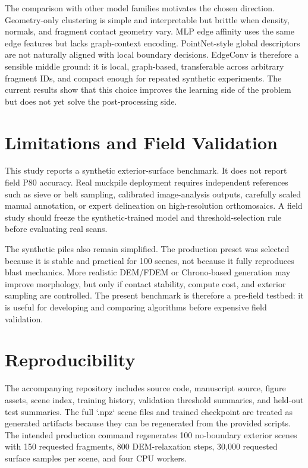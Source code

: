 \documentclass[11pt]{article}
\begin{document}
The comparison with other model families motivates the chosen direction. Geometry-only clustering is simple and interpretable but brittle when density, normals, and fragment contact geometry vary. MLP edge affinity uses the same edge features but lacks graph-context encoding. PointNet-style global descriptors are not naturally aligned with local boundary decisions. EdgeConv is therefore a sensible middle ground: it is local, graph-based, transferable across arbitrary fragment IDs, and compact enough for repeated synthetic experiments. The current results show that this choice improves the learning side of the problem but does not yet solve the post-processing side.

\section{Limitations and Field Validation}
This study reports a synthetic exterior-surface benchmark. It does not report field P80 accuracy. Real muckpile deployment requires independent references such as sieve or belt sampling, calibrated image-analysis outputs, carefully scaled manual annotation, or expert delineation on high-resolution orthomosaics. A field study should freeze the synthetic-trained model and threshold-selection rule before evaluating real scans.

The synthetic piles also remain simplified. The production preset was selected because it is stable and practical for 100 scenes, not because it fully reproduces blast mechanics. More realistic DEM/FDEM or Chrono-based generation may improve morphology, but only if contact stability, compute cost, and exterior sampling are controlled. The present benchmark is therefore a pre-field testbed: it is useful for developing and comparing algorithms before expensive field validation.

\section{Reproducibility}
The accompanying repository includes source code, manuscript source, figure assets, scene index, training history, validation threshold summaries, and held-out test summaries. The full `.npz` scene files and trained checkpoint are treated as generated artifacts because they can be regenerated from the provided scripts. The intended production command regenerates 100 no-boundary exterior scenes with 150 requested fragments, 800 DEM-relaxation steps, 30,000 requested surface samples per scene, and four CPU workers.
\end{document}
